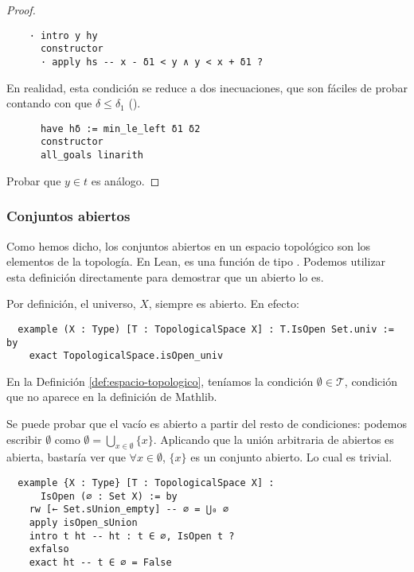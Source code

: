 \begin{proof}
  \begin{lstlisting}
    · intro y hy
      constructor
      · apply hs -- x - δ1 < y ∧ y < x + δ1 ? \end{lstlisting}

  En realidad, esta condición se reduce a dos inecuaciones, que son fáciles de probar contando con que $\delta \leq \delta_1$ ().

  \begin{lstlisting}
      have hδ := min_le_left δ1 δ2
      constructor
      all_goals linarith \end{lstlisting}

  Probar que $y \in t$ es análogo.
  
\end{proof}


\subsubsection{Conjuntos abiertos}

Como hemos dicho, los conjuntos abiertos en un espacio topológico son los elementos de la topología. En Lean, es una función  de tipo . Podemos utilizar esta definición directamente para demostrar que un abierto lo es.

\begin{example} 
    Por definición, el universo, $X$, siempre es abierto. En efecto:
\end{example}

\begin{lstlisting}
  example (X : Type) [T : TopologicalSpace X] : T.IsOpen Set.univ := by
    exact TopologicalSpace.isOpen_univ \end{lstlisting}

\begin{example}
  En la Definición \ref{def:espacio-topologico}, teníamos la condición $\emptyset \in \mathcal{T}$, condición que no aparece en la definición de Mathlib.

  Se puede probar que el vacío es abierto a partir del resto de condiciones: podemos escribir $\emptyset$ como $\emptyset = \bigcup_{x \in \emptyset} \{x\}$. Aplicando que la unión arbitraria de abiertos es abierta, bastaría ver que $\forall x \in \emptyset$, $\{x\}$ es un conjunto abierto. Lo cual es trivial.
\end{example}

\begin{lstlisting}
  example {X : Type} [T : TopologicalSpace X] :
      IsOpen (∅ : Set X) := by
    rw [← Set.sUnion_empty] -- ∅ = ⋃₀ ∅
    apply isOpen_sUnion
    intro t ht -- ht : t ∈ ∅, IsOpen t ?
    exfalso
    exact ht -- t ∈ ∅ = False
\end{lstlisting}

